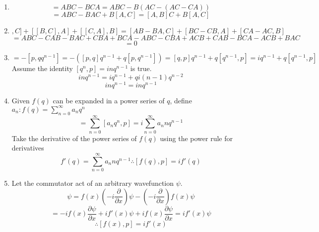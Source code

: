 \begin{sol}
\begin{enumerate}[label=\textbf{(\alph*)}]
\item
\begin{equation}
	[A,BC]=ABC-BCA=ABC-B(AC-(AC-CA))
\end{equation}\begin{equation}
	=ABC-BAC+B[A,C]=[A,B]C+B[A,C]
\end{equation}
\item
\begin{equation}
	[[A,B],C]+[[B,C],A]+[[C,A],B]=[AB-BA,C]+[BC-CB,A]+[CA-AC,B]
\end{equation} 
\begin{equation}
	=ABC-CAB-BAC+CBA+BCA-ABC-CBA+ACB+CAB-BCA-ACB+BAC
\end{equation} 
\begin{equation}
	=0
\end{equation} \item
\begin{equation}
	[q^n,p]=-[p,qq^{n-1}]=-([p,q]q^{n-1}+q[p,q^{n-1}])=[q,p]q^{n-1}+q[q^{n-1},p]=iq^{n-1}+q[q^{n-1},p]
\end{equation}
Assume the identity $[q^n,p]=inq^{n-1}$ is true.
\begin{equation}
	inq^{n-1}=iq^{n-1}+qi(n-1)q^{n-2}
\end{equation} \begin{equation}
	inq^{n-1}=inq^{n-1}
\end{equation}
\item
Given $f(q)$ can be expanded in a power series of $q$, define $a_n:f(q)=\sum_{n=0}^\infty a_nq^n$
\begin{equation}
	[f(q),p]=\sum_{n=0}^\infty[a_nq^n,p]=i\sum_{n=0}^\infty a_nnq^{n-1}
\end{equation} 
Take the derivative of the power series of $f(q)$ using the power rule for derivatives
\begin{equation}
	f'(q)=\sum_{n=0}^\infty a_n nq^{n-1}\therefore[f(q),p]=if'(q)
\end{equation}
\item
Let the commutator act of an arbitrary wavefunction $\psi$.
\begin{equation}
	[f(x),p]\psi=f(x)\left(-i\frac{\partial}{\partial x}\right)\psi-\left(-i\frac{\partial}{\partial x}\right)f(x)\psi
\end{equation}
\begin{equation}
	=-if(x)\frac{\partial\psi}{\partial x}+if'(x)\psi+if(x)\frac{\partial\psi}{\partial x}=if'(x)\psi
\end{equation} \begin{equation}
	\therefore[f(x),p]=if'(x)
\end{equation} 
\end{enumerate}
\end{sol}